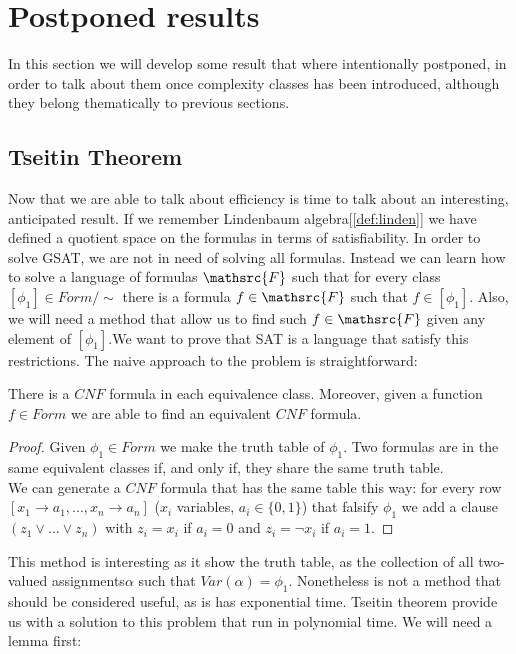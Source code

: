 \section{Postponed results}
In this section we will develop some result that where intentionally postponed, in order to talk about them once complexity classes has been introduced, although they belong thematically to previous sections. 
\subsection{Tseitin Theorem}
Now that we are able to talk about efficiency is time to talk about an interesting, anticipated result. If we remember Lindenbaum algebra[\ref{def:linden}] we have defined a quotient space on the formulas in terms of satisfiability. In order to solve GSAT, we are not in need of solving all formulas.  Instead we can learn how to solve a language of formulas $\mathsrc{F}$ such that for every class $[\phi_1]\in Form/\sim$ there  is a formula $f\in\mathsrc{F}$ such that $f \in [\phi_1]$. Also, we will need a method that allow us to find such $f\in\mathsrc{F}$ given any element of $[\phi_1]$.We want to prove that SAT is a language that satisfy this restrictions. The naive approach to the problem is straightforward:\\

\begin{proposition}
  There is a $CNF$ formula in each equivalence class. Moreover, given a function $f\in Form$ we are able to find an equivalent $CNF$ formula.
\end{proposition}
\begin{proof}
 Given $\phi_1 \in Form$ we make the truth table of $\phi_1$. Two formulas are in the same equivalent classes if, and only if, they share the same truth table. \\

  We can generate a $CNF$ formula that has the same table this way: for every row $[x_1\to a_1,...,x_n\to a_n]$ ($x_i$ variables, $a_i\in \{0,1\}$) that falsify $\phi_1$ we add a clause $(z_1\vee ... \vee z_n)$ with $z_i = x_i$ if $a_i = 0$ and  $z_i =\neg x_i$ if $a_i = 1$.
\end{proof}


  This method is interesting as it show the truth table, as the collection of all two-valued assignments$\alpha$ such that $Var(\alpha) = \phi_1$. Nonetheless is not a method that should be considered useful, as is has exponential time. Tseitin theorem provide us with a solution to this problem that run in polynomial time. We will need a lemma first:

